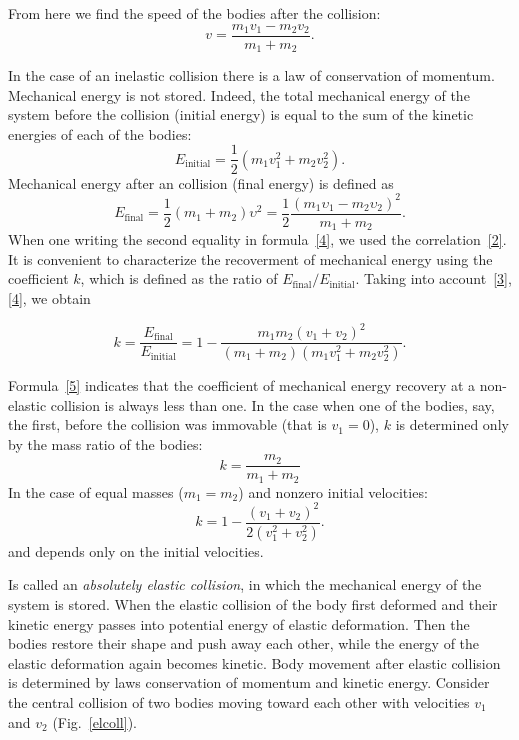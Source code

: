 \documentclass{LabWorkEng}
\begin{document}
From here we find the speed of the bodies after the collision:
\begin{equation}\label{2}
	v  = \frac{m_1v_1 - m_2v_2}{ m_1 + m_2}.
\end{equation}

In the case of an inelastic collision there is a law of conservation of momentum. Mechanical energy is not stored. Indeed, the total mechanical energy of the system before the collision (initial energy) is equal to the sum of the kinetic energies of each of the bodies:
\begin{equation}\label{3}
	E_\mathrm{initial} = \frac{1}{2}\left( {m_1v _1^2 + m_2v_2^2} \right).
\end{equation}
Mechanical energy after an collision (final energy) is defined as
\begin{equation}\label{4}
	E_\mathrm{final} = \frac{1}{2}\left( {{m_1} + {m_2}} \right){\upsilon ^2} = \frac{1}{2}\frac{{{{\left( {{m_1}{\upsilon _1} - {m_2}{\upsilon _2}} \right)}^2}}}{{{m_1} + {m_2}}}.
\end{equation}
When one writing the second equality in formula~\eqref{4}, we used the correlation~\eqref{2}. It is convenient to characterize the recoverment of mechanical energy using the coefficient $k$, which is defined as the ratio of $E_\mathrm{final}/E_\mathrm{initial}$. Taking into account~\eqref{3}, \eqref{4}, we obtain

\begin{equation}\label{5}
	k = \frac{E_\mathrm{final}}{E_\mathrm{initial}} = 1 - \frac{m_1m_2(v_1 + v_2)^2}{(m_1 + m_2)(m_1v_1^2 + m_2v_2^2)}.
\end{equation}

Formula~\eqref{5} indicates that the coefficient of mechanical energy recovery at a non-elastic collision is always less than one. In the case when one of the bodies, say, the first, before the collision was immovable (that is $v_1 = 0$), $k$ is determined only by the mass ratio of the bodies:
\begin{equation}\label{6}
	k = \frac{m_2}{m_1 + m_2}
\end{equation}
In the case of equal masses  ($m_1 = m_2$) and nonzero initial velocities:
\begin{equation}\label{6a}
	k = 1 - \frac{(v_1 + v_2)^2}{2( v_1^2 + v_2^2)}.
\end{equation}
and depends only on the initial velocities.

Is called an \textit{absolutely elastic collision}, in which the mechanical energy of the system is stored. When the elastic collision of the body first deformed and their kinetic energy passes into potential energy of elastic deformation. Then the bodies restore their shape and push away each other, while the energy of the elastic deformation again becomes kinetic. Body movement after elastic collision is determined by laws conservation of momentum and kinetic energy. Consider the central collision of two bodies moving toward each other with velocities $v_1$ and $v_2$ (Fig.~\ref{elcoll}). 
\end{document}
